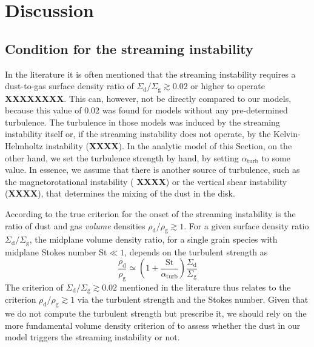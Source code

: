 \documentclass{aa}
\begin{document}
\section{Discussion}


\subsection{Condition for the streaming instability}
In the literature it is often mentioned that the streaming instability requires
a dust-to-gas surface density ratio of
$\Sigma_{\mathrm{d}}/\Sigma_{\mathrm{g}}\gtrsim 0.02$ or higher to operate {\bf
  XXXXXXXX}. This can, however, not be directly compared to our models, because
this value of $0.02$ was found for models without any pre-determined
turbulence. The turbulence in those models was induced by the streaming
instability itself or, if the streaming instability does not operate, by the
Kelvin-Helmholtz instability ({\bf XXXX}). In the analytic model of this
Section, on the other hand, we set the turbulence strength by hand, by setting
$\alpha_{\mathrm{turb}}$ to some value. In essence, we assume that there is
another source of turbulence, such as the magnetorotational instability ({\bf
  XXXX}) or the vertical shear instability ({\bf XXXX}), that determines the
mixing of the dust in the disk.

According to \citet{2005ApJ...620..459Y} the true criterion for the onset of the
streaming instability is the ratio of dust and gas {\em volume} densities
$\rho_{\mathrm{d}}/\rho_{\mathrm{g}}\gtrsim 1$. For a given surface density
ratio $\Sigma_{\mathrm{d}}/\Sigma_{\mathrm{g}}$, the midplane volume density
ratio, for a single grain species with midplane Stokes number $\mathrm{St}\ll
1$, depends on the turbulent strength as
\begin{equation}\label{eq-dtg-sig-vs-rho}
  \frac{\rho_{\mathrm{d}}}{\rho_{\mathrm{g}}}\simeq
  \left(1+\frac{\mathrm{St}}{\alpha_{\mathrm{turb}}}\right)
  \frac{\Sigma_{\mathrm{d}}}{\Sigma_{\mathrm{g}}}
\end{equation}
The criterion of $\Sigma_{\mathrm{d}}/\Sigma_{\mathrm{g}}\gtrsim 0.02$ mentioned
in the literature thus relates to the criterion
$\rho_{\mathrm{d}}/\rho_{\mathrm{g}}\gtrsim 1$ via the turbulent strength and
the Stokes number. Given that we do not compute the turbulent strength
but prescribe it, we should rely on the more fundamental volume density
criterion of \citet{2005ApJ...620..459Y} to assess whether the dust in our
model triggers the streaming instability or not.
\end{document}
